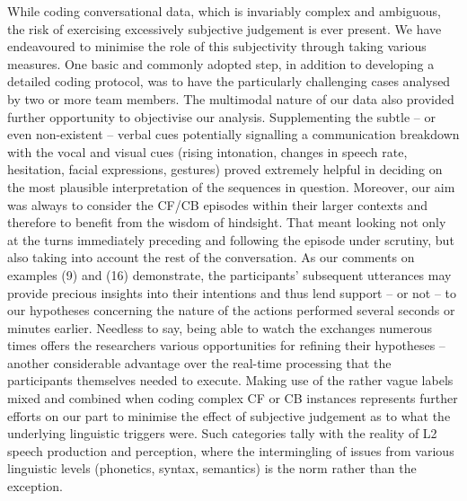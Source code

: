 \documentclass[12pt]{article}
\newenvironment{styleStandard}{\setlength\leftskip{0cm}\setlength\rightskip{0cm plus 1fil}\setlength\parindent{0cm}\setlength\parfillskip{0pt plus 1fil}\setlength\parskip{0cm plus 1pt}\writerlistparindent\writerlistleftskip\leavevmode\normalfont\normalsize\writerlistlabel\ignorespaces}{\unskip\vspace{0cm plus 1pt}\par}
\newcommand\writerlistleftskip{}
\newcommand\writerlistparindent{}
\newcommand\writerlistlabel{}
\begin{document}
\begin{styleStandard}
While coding conversational data, which is invariably complex and ambiguous, the risk of exercising excessively subjective judgement is ever present. We have endeavoured to minimise the role of this subjectivity through taking various measures. One basic and commonly adopted step, in addition to developing a detailed coding protocol, was to have the particularly challenging cases analysed by two or more team members. The multimodal nature of our data also provided further opportunity to objectivise our analysis. Supplementing the subtle – or even non-existent – verbal cues potentially signalling a communication breakdown with the vocal and visual cues (rising intonation, changes in speech rate, hesitation, facial expressions, gestures) proved extremely helpful in deciding on the most plausible interpretation of the sequences in question. Moreover, our aim was always to consider the CF/CB episodes within their larger contexts and therefore to benefit from the wisdom of hindsight. That meant looking not only at the turns immediately preceding and following the episode under scrutiny, but also taking into account the rest of the conversation. As our comments on examples (9) and (16) demonstrate, the participants’ subsequent utterances may provide precious insights into their intentions and thus lend support – or not – to our hypotheses concerning the nature of the actions performed several seconds or minutes earlier. Needless to say, being able to watch the exchanges numerous times offers the researchers various opportunities for refining their hypotheses – another considerable advantage over the real-time processing that the participants themselves needed to execute. Making use of the rather vague labels mixed and combined\textit{ }when coding complex CF or CB instances represents further efforts on our part to minimise the effect of subjective judgement as to what the underlying linguistic triggers were. Such categories tally with the reality of L2 speech production and perception, where the intermingling of issues from various linguistic levels (phonetics, syntax, semantics) is the norm rather than the exception. 
\end{styleStandard}
\end{document}
